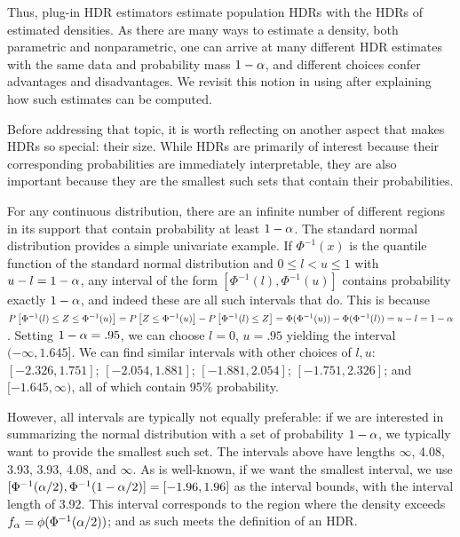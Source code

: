 Thus, plug-in HDR estimators estimate population HDRs with the HDRs of estimated densities.
As there are many ways to estimate a density, both parametric and nonparametric,
one can arrive at many different HDR estimates with the same data and probability mass $1 - \alpha$,
and different choices confer advantages and disadvantages.
We revisit this notion in  using  after explaining how such estimates can be computed.

Before addressing that topic, it is worth reflecting on another aspect that makes HDRs so special: their size. While HDRs are primarily of interest because their corresponding probabilities are immediately interpretable, they are also important because they are the smallest such sets that contain their probabilities.

For any continuous distribution, there are an infinite number of different regions in its support that contain probability at least $1 - \alpha$.
The standard normal distribution provides a simple univariate example.
If $\Phi^{-1}(x)$ is the quantile function of the standard normal distribution and $0 \leq l < u \leq 1$ with $u - l = 1 - \alpha$,
any interval of the form $[\Phi^{-1}(l), \Phi^{-1}(u)]$ contains probability exactly $1-\alpha$, and indeed these are all such intervals that do.
This is because $P\left[\Phi^{-1}(l) \leq Z \leq \Phi^{-1}(u)\right] = P\left[Z \leq \Phi^{-1}(u)\right] - P\left[\Phi^{-1}(l) \leq Z\right] = \Phi(\Phi^{-1}(u)) - \Phi(\Phi^{-1}(l)) = u - l = 1 - \alpha$.
Setting $1 - \alpha = .95$, we can choose
$l = 0$, $u = .95$ yielding the interval $(-\infty, 1.645]$.
We can find similar intervals with other choices of $l, u$:
$[-2.326, 1.751]$;
$[-2.054, 1.881]$;
$[-1.881, 2.054]$;
$[-1.751, 2.326]$; and
$[-1.645, \infty)$,
all of which contain 95\% probability.

However, all intervals are typically not equally preferable: if we are interested in summarizing the normal distribution with a set of probability $1 - \alpha$, we typically want to provide the smallest such set.
The intervals above have lengths $\infty$, 4.08, 3.93, 3.93, 4.08, and $\infty$.
As is well-known, if we want the smallest interval, we use $[\Phi^{-1}(\alpha/2), \Phi^{-1}(1-\alpha/2)] = [-1.96, 1.96]$ as the interval bounds, with the interval length of 3.92.
This interval corresponds to the region where the density exceeds $f_{\alpha} = \phi(\Phi^{-1}(\alpha/2))$;
and as such meets the definition of an HDR.

